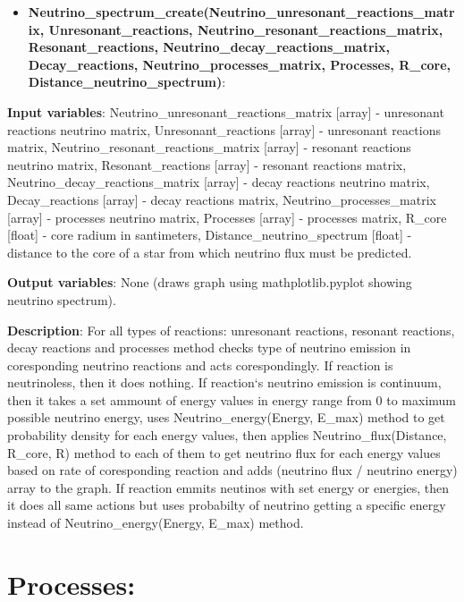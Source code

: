 \documentclass[a4paper,12pt]{article}
\newcommand{\namefunction}[4]{
  \begin{itemize}
    \item \textbf{#1}:
  \end{itemize}
  
  \textbf{Input variables}: #2.
  
  \textbf{Output variables}: #4.
  
  \textbf{Description}: #3.
}
\begin{document}
\namefunction{Neutrino\_spectrum\_create(Neutrino\_unresonant\_reactions\_matrix, Unresonant\_reactions, Neutrino\_resonant\_reactions\_matrix, Resonant\_reactions, Neutrino\_decay\_reactions\_matrix, Decay\_reactions, Neutrino\_processes\_matrix, Processes, R\_core, Distance\_neutrino\_spectrum)}{Neutrino\_unresonant\_reactions\_matrix [array] - unresonant reactions neutrino matrix, Unresonant\_reactions [array] - unresonant reactions matrix, Neutrino\_resonant\_reactions\_matrix [array] - resonant reactions neutrino matrix, Resonant\_reactions [array] - resonant reactions matrix, Neutrino\_decay\_reactions\_matrix [array] - decay reactions neutrino matrix, Decay\_reactions [array] - decay reactions matrix, Neutrino\_processes\_matrix [array] - processes neutrino matrix, Processes [array] - processes matrix, R\_core [float] - core radium in santimeters, Distance\_neutrino\_spectrum [float] - distance to the core of a star from which neutrino flux must be predicted}{For all types of reactions: unresonant reactions, resonant reactions, decay reactions and processes method checks type of neutrino emission in coresponding neutrino reactions and acts corespondingly. If reaction is neutrinoless, then it does nothing. If reaction`s neutrino emission is continuum, then it takes a set ammount of energy values in energy range from 0 to maximum possible neutrino energy, uses Neutrino\_energy(Energy, E\_max) method to get probability density for each energy values, then applies Neutrino\_flux(Distance, R\_core, R) method to each of them to get neutrino flux for each energy values based on rate of coresponding reaction and adds (neutrino flux / neutrino energy) array to the graph. If reaction emmits neutinos with set energy or energies, then it does all same actions but uses probabilty of neutrino getting a specific energy instead of Neutrino\_energy(Energy, E\_max) method}{None (draws graph using mathplotlib.pyplot showing neutrino spectrum)}

\section{Processes:}

\vspace{1em}
\end{document}
